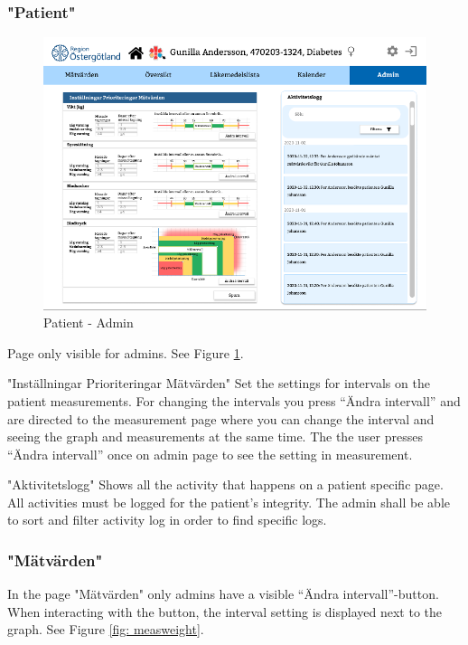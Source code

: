 \documentclass{scrreprt}
\begin{document}
\subsubsection{"Patient"}
\begin{figure}[h!]
    \centering
    \includegraphics[width=15cm]{patadmin.png}
    \caption{Patient - Admin}
    \label{fig: patadmin}
\end{figure}

Page only visible for admins. See Figure \ref{fig: patadmin}.

"Inställningar Prioriteringar Mätvärden"
Set the settings for intervals on the patient measurements. For changing the intervals you press “Ändra intervall” and are directed to the measurement page where you can change the interval and seeing the graph and measurements at the same time. The the user presses “Ändra intervall” once on admin page to see the setting in measurement.

"Aktivitetslogg"
Shows all the activity that happens on a patient specific page. All activities must be logged for the patient's integrity. The admin shall be able to sort and filter activity log in order to find specific logs.

\subsubsection{"Mätvärden"}
In the page "Mätvärden" only admins have a visible  “Ändra intervall”-button. When interacting with the button, the interval setting is displayed next to the graph. See Figure \ref{fig: measweight}.


\end{document}
